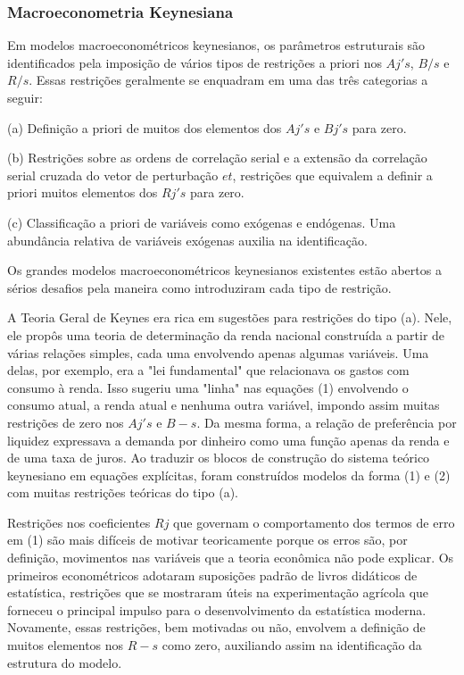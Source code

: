 \documentclass[a4paper,12pt]{article}[abntex2]
\begin{document}
\subsubsection{\textbf{Macroeconometria Keynesiana}}


Em modelos macroeconométricos keynesianos, os parâmetros estruturais são identificados pela imposição de vários tipos de restrições a priori nos $Aj's$, $B/s$ e $R/s$. Essas restrições geralmente se enquadram em uma das três categorias a seguir:

(a) Definição a priori de muitos dos elementos dos $Aj's$ e $Bj's$ para zero.

(b) Restrições sobre as ordens de correlação serial e a extensão da correlação serial cruzada do vetor de perturbação $et$, restrições que equivalem a definir a priori muitos elementos dos $Rj's$ para zero.

(c) Classificação a priori de variáveis como exógenas e endógenas. Uma abundância relativa de variáveis exógenas auxilia na identificação.

Os grandes modelos macroeconométricos keynesianos existentes estão abertos a sérios desafios pela maneira como introduziram cada tipo de restrição.

A Teoria Geral de Keynes era rica em sugestões para restrições do tipo (a). Nele, ele propôs uma teoria de determinação da renda nacional construída a partir de várias relações simples, cada uma envolvendo apenas algumas variáveis. Uma delas, por exemplo, era a "lei fundamental" que relacionava os gastos com consumo à renda. Isso sugeriu uma "linha" nas equações (1) envolvendo o consumo atual, a renda atual e nenhuma outra variável, impondo assim muitas restrições de zero nos $Aj's$ e $B-s$. Da mesma forma, a relação de preferência por liquidez expressava a demanda por dinheiro como uma função apenas da renda e de uma taxa de juros. Ao traduzir os blocos de construção do sistema teórico keynesiano em equações explícitas, foram construídos modelos da forma (1) e (2) com muitas restrições teóricas do tipo (a).

Restrições nos coeficientes $Rj$ que governam o comportamento dos termos de erro em (1) são mais difíceis de motivar teoricamente porque os erros são, por definição, movimentos nas variáveis que a teoria econômica não pode explicar. Os primeiros econométricos adotaram suposições padrão de livros didáticos de estatística, restrições que se mostraram úteis na experimentação agrícola que forneceu o principal impulso para o desenvolvimento da estatística moderna. Novamente, essas restrições, bem motivadas ou não, envolvem a definição de muitos elementos nos $R-s$ como zero, auxiliando assim na identificação da estrutura do modelo.
\end{document}
